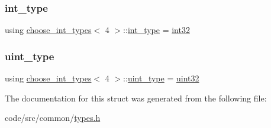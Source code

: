 \subsubsection{\texorpdfstring{int\+\_\+type}{int\_type}}
{\footnotesize\ttfamily using \hyperlink{structchoose__int__types}{choose\+\_\+int\+\_\+types}$<$ 4 $>$\+::\hyperlink{structchoose__int__types_3_014_01_4_af6cc8894e99e97c539077c9e640ed478}{int\+\_\+type} =  \hyperlink{types_8h_a3d594eb72953c94a18a03d929ebd9167}{int32}}

\mbox{\label{structchoose__int__types_3_014_01_4_a3c2319206150de67a68544e265dabb29}} 
\subsubsection{\texorpdfstring{uint\+\_\+type}{uint\_type}}
{\footnotesize\ttfamily using \hyperlink{structchoose__int__types}{choose\+\_\+int\+\_\+types}$<$ 4 $>$\+::\hyperlink{structchoose__int__types_3_014_01_4_a3c2319206150de67a68544e265dabb29}{uint\+\_\+type} =  \hyperlink{types_8h_a8f95e75e58492e87412191fabadd8ca8}{uint32}}



The documentation for this struct was generated from the following file\+:\begin{DoxyCompactItemize}
\item 
code/src/common/\hyperlink{types_8h}{types.\+h}\end{DoxyCompactItemize}
